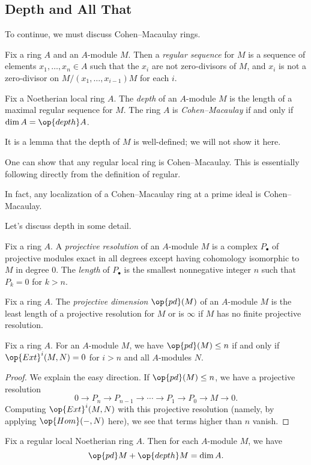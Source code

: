 \documentclass[../notes.tex]{subfiles}
\begin{document}
\subsection{Depth and All That}
To continue, we must discuss Cohen--Macaulay rings.
\begin{definition}
	Fix a ring $A$ and an $A$-module $M$. Then a \textit{regular sequence} for $M$ is a sequence of elements $x_1,\ldots,x_n\in A$ such that the $x_i$ are not zero-divisors of $M$, and $x_i$ is not a zero-divisor on $M/(x_1,\ldots,x_{i-1})M$ for each $i$.
\end{definition}
\begin{definition}
	Fix a Noetherian local ring $A$. The \textit{depth} of an $A$-module $M$ is the length of a maximal regular sequence for $M$. The ring $A$ is \textit{Cohen--Macaulay} if and only if $\dim A=\op{depth}A$.
\end{definition}
It is a lemma that the depth of $M$ is well-defined; we will not show it here.
\begin{remark}
	One can show that any regular local ring is Cohen--Macaulay. This is essentially following directly from the definition of regular.
\end{remark}
\begin{remark}
	In fact, any localization of a Cohen--Macaulay ring at a prime ideal is Cohen--Macaulay.
\end{remark}
Let's discuss depth in some detail.
\begin{definition}
	Fix a ring $A$. A \textit{projective resolution} of an $A$-module $M$ is a complex $P_\bullet$ of projective modules exact in all degrees except having cohomology isomorphic to $M$ in degree $0$. The \textit{length} of $P_\bullet$ is the smallest nonnegative integer $n$ such that $P_k=0$ for $k>n$.
\end{definition}
\begin{definition}
	Fix a ring $A$. The \textit{projective dimension} $\op{pd}(M)$ of an $A$-module $M$ is the least length of a projective resolution for $M$  or is $\infty$ if $M$ has no finite projective resolution.
\end{definition}
\begin{proposition}
	Fix a ring $A$. For an $A$-module $M$, we have $\op{pd}(M)\le n$ if and only if $\op{Ext}^i(M,N)=0$ for $i>n$ and all $A$-modules $N$.
\end{proposition}
\begin{proof}
	We explain the easy direction. If $\op{pd}(M)\le n$, we have a projective resolution
	\[0\to P_n\to P_{n-1}\to\cdots\to P_1\to P_0\to M\to0.\]
	Computing $\op{Ext}^i(M,N)$ with this projective resolution (namely, by applying $\op{Hom}(-,N)$ here), we see that terms higher than $n$ vanish.
\end{proof}
\begin{proposition}
	Fix a regular local Noetherian ring $A$. Then for each $A$-module $M$, we have
	\[\op{pd}M+\op{depth}M=\dim A.\]
\end{proposition}
\end{document}
